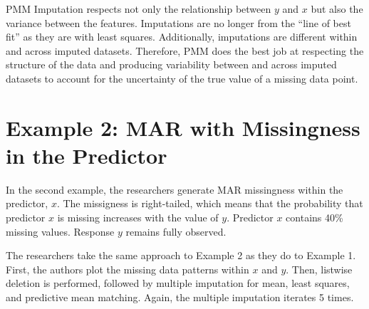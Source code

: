 \documentclass[12pt,oneside]{chicagocapstone}
\begin{document}
PMM Imputation respects not only the relationship between \(y\) and
\(x\) but also the variance between the features. Imputations are no
longer from the ``line of best fit'' as they are with least squares.
Additionally, imputations are different within and across imputed
datasets. Therefore, PMM does the best job at respecting the structure
of the data and producing variability between and across imputed
datasets to account for the uncertainty of the true value of a missing
data point.

\section*{Example 2: MAR with Missingness in the
Predictor}\label{example-2-mar-with-missingness-in-the-predictor}

In the second example, the researchers generate MAR missingness within
the predictor, \(x\). The missigness is right-tailed, which means that
the probability that predictor \(x\) is missing increases with the value
of \(y\). Predictor \(x\) contains 40\% missing values. Response \(y\)
remains fully observed.

The researchers take the same approach to Example 2 as they do to
Example 1. First, the authors plot the missing data patterns within
\(x\) and \(y\). Then, listwise deletion is performed, followed by
multiple imputation for mean, least squares, and predictive mean
matching. Again, the multiple imputation iterates 5 times.
\end{document}
